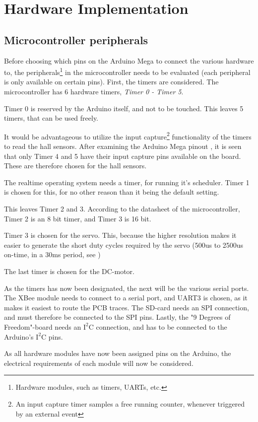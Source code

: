 \section{Hardware Implementation}
\subsection{Microcontroller peripherals}
Before choosing which pins on the Arduino Mega to connect the various hardware to, the peripherals\footnote{Hardware modules, such as timers, UARTs, etc.} in the microcontroller needs to be evaluated (each peripheral is only available on certain pins). First, the timers are considered. The microcontroller has 6 hardware timers, \emph{Timer 0 - Timer 5}.

Timer 0 is reserved by the Arduino itself, and not to be touched.  This leaves 5 timers, that can be used freely.

It would be advantageous to utilize the input capture\footnote{An input capture timer samples a free running counter, whenever triggered by  an external event} functionality of the timers to read the hall sensors. After examining the Arduino Mega pinout , it is seen that only Timer 4 and 5 have their input capture pins available on the board. These are therefore chosen for the hall sensors.
   
The realtime operating system needs a timer, for running it's scheduler. Timer 1 is chosen for this, for no other reason than it being the default setting.

This leaves Timer 2 and 3. According to the datasheet of the microcontroller, Timer 2 is an 8 bit timer, and Timer 3 is 16 bit. 

Timer 3 is chosen for the servo. This, because the higher resolution makes it easier to generate the short duty cycles required by the servo (500us to 2500us on-time, in a 30ms period, see )

The last timer is chosen for the DC-motor.

As the timers has now been designated, the next will be the various serial ports. The XBee module needs to connect to a serial port, and UART3 is chosen, as it makes it easiest to route the PCB traces. The SD-card needs an SPI connection, and must therefore be connected to the SPI pins. Lastly, the "9 Degrees of Freedom"-board needs an $\text{I}^2\text{C}$ connection, and has to be connected to the Arduino's $\text{I}^2\text{C}$ pins.

As all hardware modules have now been assigned pins on the Arduino, the electrical requirements of each module will now be considered.

